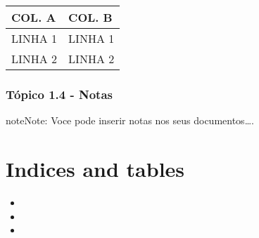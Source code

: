 \documentclass[letterpaper,10pt,english]{sphinxmanual}
\begin{document}
\begin{savenotes}\sphinxattablestart
\centering
\begin{tabulary}{\linewidth}[t]{|T|T|}
\hline
\sphinxstyletheadfamily 
COL. A
&\sphinxstyletheadfamily 
COL. B
\\
\hline
LINHA 1
&
LINHA 1
\\
\hline
LINHA 2
&
LINHA 2
\\
\hline
\end{tabulary}
\par
\sphinxattableend\end{savenotes}


\subsection{Tópico 1.4 - Notas}
\label{\detokenize{lab/sphinx_lab:topico-1-4-notas}}
\begin{sphinxadmonition}{note}{Note:}
Voce pode inserir notas nos seus documentos….
\end{sphinxadmonition}


\chapter{Indices and tables}
\label{\detokenize{index:indices-and-tables}}\begin{itemize}
\item {} 

\item {} 

\item {} 

\end{itemize}



\renewcommand{\indexname}{Index}
\printindex
\end{document}
